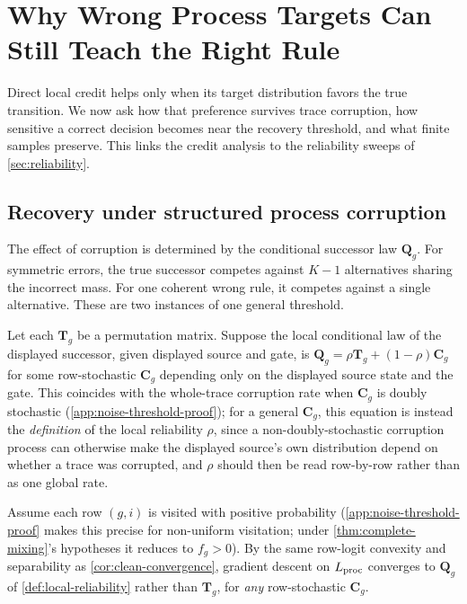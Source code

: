 \section{Why Wrong Process Targets Can Still Teach the Right Rule}
\label{sec:credit-under-noise}

Direct local credit helps only when its target distribution favors the true
transition. We now ask how that preference survives trace corruption, how
sensitive a correct decision becomes near the recovery threshold, and what
finite samples preserve. This links the credit analysis to the reliability
sweeps of \cref{sec:reliability}.

\subsection{Recovery under structured process corruption}
The effect of corruption is determined by the conditional successor law $\bm{Q}_g$.
For symmetric errors, the true successor competes against $K-1$ alternatives
sharing the incorrect mass. For one coherent wrong rule, it competes against a
single alternative. These are two instances of one general threshold.

\begin{definition}
\label{def:local-reliability}
Let each $\bm T_g$ be a permutation matrix. Suppose the local conditional
law of the displayed successor, given displayed source and gate, is
\(\bm{Q}_g=\rho \bm{T}_g+(1-\rho)\bm{C}_g\) for some row-stochastic \(\bm{C}_g\)
depending only on the displayed source state and the gate. This coincides
with the whole-trace corruption rate when $\bm{C}_g$ is doubly stochastic
(\cref{app:noise-threshold-proof}); for a general $\bm{C}_g$, this equation
is instead the \emph{definition} of the local reliability $\rho$, since a
non-doubly-stochastic corruption process can otherwise make the displayed
source's own distribution depend on whether a trace was corrupted, and
$\rho$ should then be read row-by-row rather than as one global rate.
\end{definition}

\begin{proposition}
\label{prop:noise-convergence}
Assume each row $(g,i)$ is visited with positive probability
(\cref{app:noise-threshold-proof} makes this precise for non-uniform
visitation; under \cref{thm:complete-mixing}'s hypotheses it reduces to
$f_g>0$). By the same row-logit convexity and separability as
\cref{cor:clean-convergence}, gradient descent on $L_{\rm proc}$ converges
to $\bm{Q}_g$ of \cref{def:local-reliability} rather than $\bm{T}_g$, for
\emph{any} row-stochastic $\bm{C}_g$.
\end{proposition}

